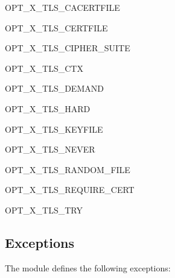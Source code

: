 \begin{datadesc}{OPT_X_TLS_CACERTFILE}
\end{datadesc}

\begin{datadesc}{OPT_X_TLS_CERTFILE}
\end{datadesc}

\begin{datadesc}{OPT_X_TLS_CIPHER_SUITE}
\end{datadesc}

\begin{datadesc}{OPT_X_TLS_CTX}
\end{datadesc}

\begin{datadesc}{OPT_X_TLS_DEMAND}
\end{datadesc}

\begin{datadesc}{OPT_X_TLS_HARD}
\end{datadesc}

\begin{datadesc}{OPT_X_TLS_KEYFILE}
\end{datadesc}

\begin{datadesc}{OPT_X_TLS_NEVER}
\end{datadesc}

\begin{datadesc}{OPT_X_TLS_RANDOM_FILE}
\end{datadesc}

\begin{datadesc}{OPT_X_TLS_REQUIRE_CERT}
\end{datadesc}

\begin{datadesc}{OPT_X_TLS_TRY}
\end{datadesc}



\subsection{Exceptions}
\label{subsec:exceptfrommeth}

The module defines the following exceptions:

